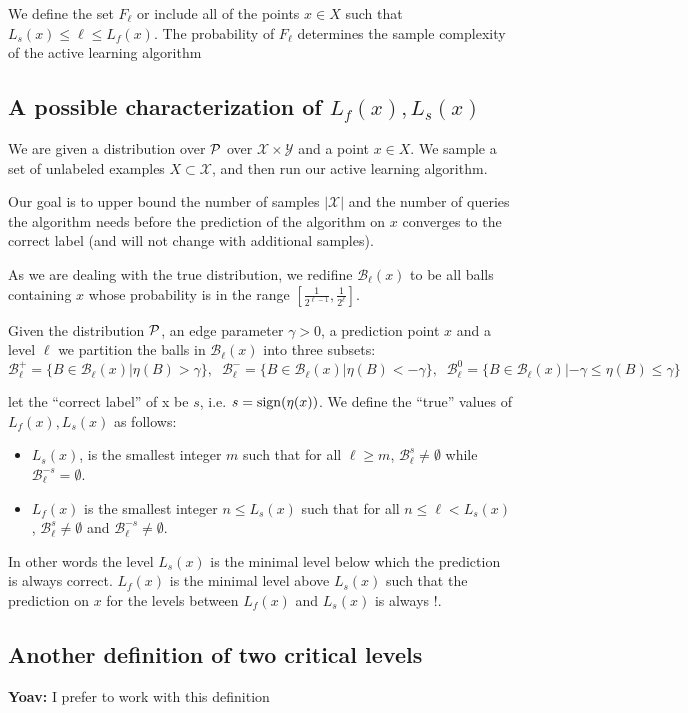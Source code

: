 \documentclass{article}
\def\X{{\mathcal X}}
\def\Y{{\mathcal Y}}
\def\B{{\mathcal B}}
\def\sign{{\rm sign}}
\newcommand{\yoav}[1]{{\color{blue} {\bf Yoav:} #1}}
\begin{document}
We define the set $F_\ell$ or include all of the points $x \in X$ such that $L_s(x) \leq \ell \leq L_f(x)$. The probability of $F_\ell$ determines the sample complexity of the active learning algorithm

\subsection{A possible characterization of $L_f(x),L_s(x)$}

\renewcommand{\P}{{\cal P}}
We are given a distribution over $\P$ over $\X \times \Y$ and a point $x \in X$.
We sample a set of unlabeled examples $X \subset \X$, and then run our active learning algorithm.

Our goal is to upper bound the number of samples $|\X|$ and the number
of queries the algorithm needs before the prediction of the algorithm
on $x$ converges to the correct label (and will not change with additional samples).

As we are dealing with the true distribution, we redifine $\B_\ell(x)$
to be all balls containing $x$ whose probability is in the range
$\left[ \frac{1}{2^{\ell-1}}, \frac{1}{2^\ell}\right]$.

Given the distribution $\P$, an edge parameter $\gamma>0$, a
prediction point $x$ and a level $\ell$ we partition the balls in $\B_{\ell}(x)$ into three 
subsets:
$$\B_{\ell}^+ = \{ B \in \B_\ell(x) | \eta(B)  > \gamma\},\;\;
\B_{\ell}^- = \{ B \in \B_\ell(x) | \eta(B)  < -\gamma\},\;\;
\B_{\ell}^0 = \{ B \in \B_\ell(x) | -\gamma \leq \eta(B) \leq \gamma\}$$

let the ``correct label'' of x be $s$, i.e. $s = \sign(\eta(x))$.
We define the ``true'' values of  $L_f(x),L_s(x)$ as follows:
\begin{itemize}
\item $L_s(x)$, is the smallest integer $m$ such that for all $\ell\geq
  m$, $\B_\ell^s \neq \emptyset$ while $\B_\ell^{-s} = \emptyset$.
\item $L_f(x)$ is the smallest integer $n \leq L_s(x)$ such that for
  all $n\leq \ell < L_s(x)$, $\B_\ell^s \neq \emptyset$ and $\B_\ell^{-s} \neq \emptyset$.
\end{itemize}

In other words the level $L_s(x)$ is the minimal level below which the
prediction is always correct. $L_f(x)$ is the minimal level above $L_s(x)$
such that the prediction on $x$ for the levels between  $L_f(x)$ and
$L_s(x)$ is always $!$.

\subsection{Another definition of two critical levels}
\yoav{I prefer to work with this definition}
\end{document}
